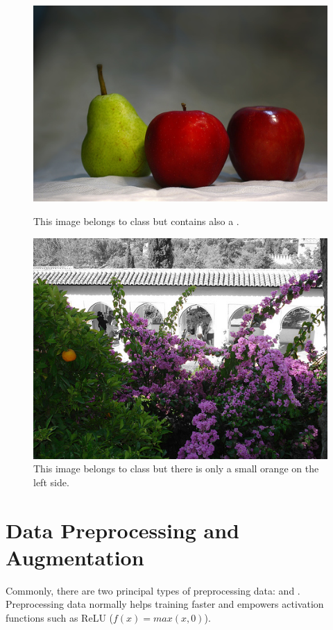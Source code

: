 \begin{figure}[!ht]
	\centering
	\begin{minipage}[t]{0.45\linewidth}
		\includegraphics[scale=0.37]{./figures/imhard1}
		\caption{This image belongs to class  but contains also a .}
		\label{fig:imhard1}
	\end{minipage}
	\quad
	\begin{minipage}[t]{0.45\linewidth}
		\includegraphics[scale=0.35]{./figures/imhard2}
		\caption{This image belongs to class  but there is only a small orange on the left side.}
		\label{fig:imhard2}
	\end{minipage}
\end{figure}

\section{Data Preprocessing and Augmentation}
Commonly, there are two principal types of preprocessing data:  and . Preprocessing data normally helps training faster and empowers activation functions such as ReLU ($f(x) = max(x, 0)$).

